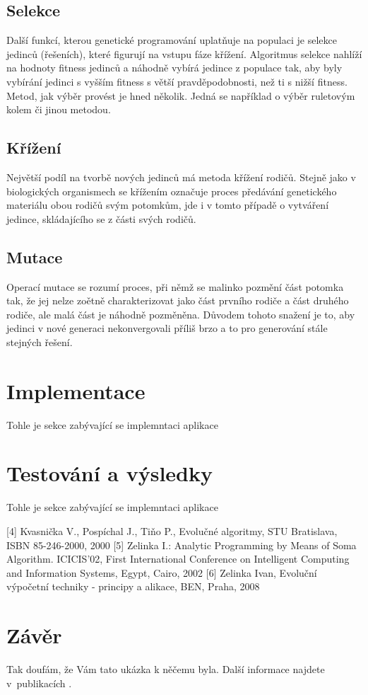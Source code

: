 \documentclass[bc,male,java,dept460]{diploma}		%
\begin{document}
\subsection{Selekce}
Další funkcí, kterou genetické programování uplatňuje na populaci je selekce jedinců (řešeních), které figurují na vstupu fáze křížení. Algoritmus selekce nahlíží na hodnoty fitness jedinců a náhodně vybírá jedince z populace tak, aby byly vybírání jedinci s vyšším fitness s větší pravděpodobnosti, než ti s nižší fitness.
Metod, jak výběr provést je hned několik. Jedná se například o výběr ruletovým kolem či jinou metodou.
\subsection{Křížení}
Největší podíl na tvorbě nových jedinců má metoda křížení rodičů. Stejně jako v biologických organismech se křížením označuje proces předávání genetického materiálu obou rodičů svým potomkům, jde i v tomto případě o vytváření jedince, skládajícího se z části svých rodičů.
\subsection{Mutace}
Operací mutace se rozumí proces, při němž se malinko pozmění část potomka tak, že jej nelze zoětně charakterizovat jako část prvního rodiče a část druhého rodiče, ale malá část je náhodně pozměněna. Důvodem tohoto snažení je to, aby jedinci v nové generaci nekonvergovali příliš brzo a to pro generování stále stejných řešení.

\section{Implementace}
Tohle je sekce zabývající se implemntaci aplikace

\section{Testování a výsledky}
Tohle je sekce zabývající se implemntaci aplikace

[4] Kvasnička V., Pospíchal J., Tiňo P., Evolučné algoritmy, STU Bratislava, ISBN 85-246-2000, 2000
[5] Zelinka I.: Analytic Programming by Means of Soma Algorithm. ICICIS’02, First International Conference on Intelligent Computing and Information Systems, Egypt, Cairo, 2002
[6] Zelinka Ivan, Evoluční výpočetní techniky - principy a alikace, BEN, Praha, 2008 

\section{Závěr}
\label{sec:Conclusion}
Tak doufám, že Vám tato ukázka k něčemu byla. Další informace najdete v~publikacích
\cite{goossens94,lamport94}.
\end{document}
